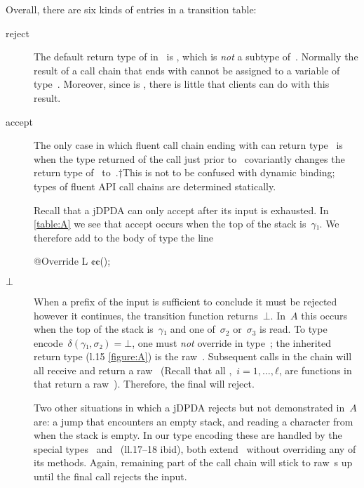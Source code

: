 Overall, there are six kinds of entries in a transition table:
\begin{description}

  \item[\textsf{reject}]
  The default return type of \cc{\$()} in~ is , which
  is \emph{not} a subtype of~. Normally the result of a call chain that ends with \cc{\$()}
  cannot be assigned to a variable of type~. Moreover, since  is ,
  there is little that clients can do with this result.

  \item[\textsf{accept}]
  The only case in which fluent call chain ending with \cc{\$()} can return
    type~ is when the type returned of the call just prior to~ covariantly
    changes the return type of~\cc{\$()} to~.†{This is not to be confused with dynamic binding;
    types of fluent API call chains are determined statically.}
  \par
  Recall that a jDPDA can only accept after its input is exhausted.
  In \cref{table:A} we see that \textsf{accept} occurs when the top of the stack is~$γ₁$.
  We therefore add to the body of type  the line
  \begin{JAVA}
@Override L ¢\gobble$¢$();
  \end{JAVA}

  \item[$⊥$]
  When a prefix of the input is sufficient to conclude it must be rejected however it continues,
    the transition function returns~$⊥$.
  In~$A$ this occurs when the top of the stack is~$γ₁$ and one of~$σ_2$ or~$σ_3$ is read.
  To type encode~$δ(γ₁,σ₂) =⊥$, one must \emph{not} override  in type~;
    the inherited return type (l.15 \cref{figure:A}) is the raw~.
  Subsequent calls in the chain will all receive and return a raw~
    (Recall that all ,~$i=1,…,ℓ$, are functions in~ that return a raw~).
  Therefore, the final \cc{\$()} will reject.
  \par
  Two other situations in which a jDPDA rejects but not demonstrated in~$A$ are:
    a \textsf{jump} that encounters an empty stack, and reading a character from when the stack is empty.
  In our type encoding these are handled by the special
    types~ and~ (ll.17--18 ibid), both extend~ without
    overriding any of its methods. Again, remaining part of the call chain will stick to
    raw~s up until the final \cc{\$()} call rejects the input.


\end{description}
